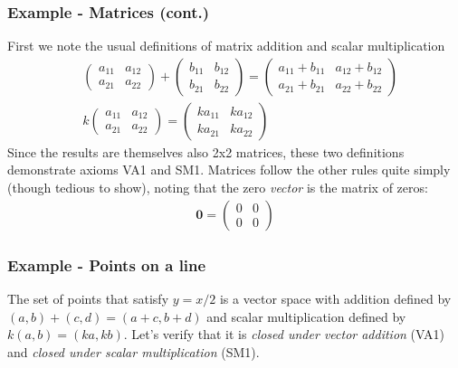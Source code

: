 \documentclass[usenames,dvipsnames,aspectratio=169,10pt]{beamer}
\numberwithin{equation}{section}
\begin{document}
\begin{frame}
\frametitle{Example - Matrices (cont.)}

First we note the usual definitions of matrix addition and scalar multiplication
\begin{align*}
&
\begin{pmatrix}
a_{11} & a_{12} \\
a_{21} & a_{22}
\end{pmatrix}
+
\begin{pmatrix}
b_{11} & b_{12} \\
b_{21} & b_{22}
\end{pmatrix}
=
\begin{pmatrix}
a_{11}+b_{11} & a_{12}+b_{12} \\
a_{21}+b_{21} & a_{22}+b_{22}
\end{pmatrix}
\\
& k
\begin{pmatrix}
a_{11} & a_{12} \\
a_{21} & a_{22}
\end{pmatrix}
=
\begin{pmatrix}
ka_{11} & ka_{12} \\
ka_{21} & ka_{22}
\end{pmatrix}
\end{align*}
Since the results are themselves also 2x2 matrices, these two definitions demonstrate axioms VA1 and SM1. Matrices follow the other rules quite simply (though tedious to show), noting that the zero \textit{vector} is the matrix of zeros:
\begin{align*}
\textbf{0}
=
\begin{pmatrix}
0 & 0 \\
0 & 0
\end{pmatrix}
\end{align*}
\end{frame}





\begin{frame}
\frametitle{Example - Points on a line}
The set of points that satisfy $y=x/2$ is a vector space with addition defined by $(a,b)+(c,d)=(a+c,b+d)$ and scalar multiplication defined by $k(a,b)=(ka,kb)$. Let's verify that it is \textit{closed under vector addition} (VA1) and \textit{closed under scalar multiplication} (SM1).
\end{frame}
\end{document}
